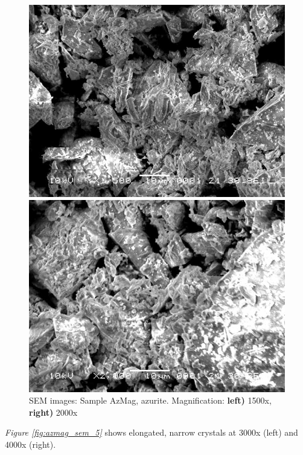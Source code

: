 \begin{figure}[H]
\centering
\begin{minipage}{.45\textwidth}
  \centering
  \includegraphics[width=\linewidth]{AzMag_x1500_5_160321}
\end{minipage}
\begin{minipage}{.45\textwidth}
  \centering
  \includegraphics[width=\linewidth]{AzMag_x2000_1_160321}
\end{minipage}
\caption[SEM images: Sample AzMag, azurite]{SEM images: Sample AzMag, azurite. Magnification: \textbf{left)} 1500x, \textbf{right)} 2000x}
\label{fig:azmag_sem_4}
\end{figure}

\textit{Figure \ref{fig:azmag_sem_5}} shows elongated, narrow crystals at 3000x (left) and 4000x (right). 

